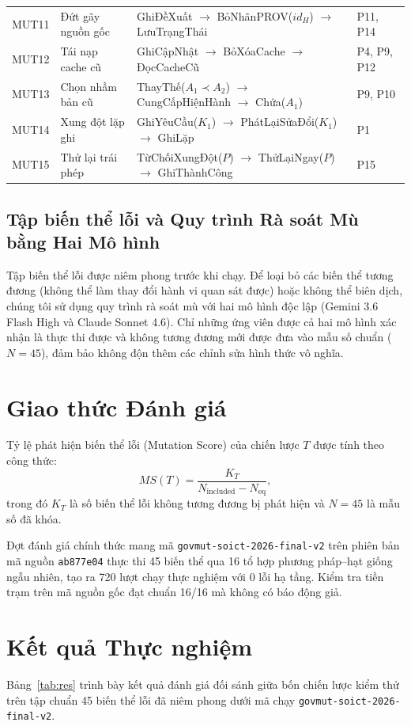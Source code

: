 \documentclass[11pt]{article}
\begin{document}
\begin{table}[t]
\begin{tabularx}{\textwidth}{p{}p{}p{}X}
MUT11 & Đứt gãy nguồn gốc & GhiĐềXuất $\to$ BỏNhãnPROV($id_H$) $\to$ LưuTrạngThái & P11, P14\\
MUT12 & Tái nạp cache cũ & GhiCậpNhật $\to$ BỏXóaCache $\to$ ĐọcCacheCũ & P4, P9, P12\\
MUT13 & Chọn nhầm bản cũ & ThayThế($A_1 \prec A_2$) $\to$ CungCấpHiệnHành $\to$ Chứa($A_1$) & P9, P10\\
MUT14 & Xung đột lặp ghi & GhiYêuCầu($K_1$) $\to$ PhátLạiSửaĐổi($K_1$) $\to$ GhiLặp & P1\\
MUT15 & Thử lại trái phép & TừChốiXungĐột($P$) $\to$ ThửLạiNgay($P$) $\to$ GhiThànhCông & P15\\
\bottomrule
\end{tabularx}
\end{table}

\subsection{Tập biến thể lỗi và Quy trình Rà soát Mù bằng Hai Mô hình}
Tập biến thể lỗi được niêm phong trước khi chạy. Để loại bỏ các biến thể tương đương (không thể làm thay đổi hành vi quan sát được) hoặc không thể biên dịch, chúng tôi sử dụng quy trình rà soát mù với hai mô hình độc lập (Gemini 3.6 Flash High và Claude Sonnet 4.6). Chỉ những ứng viên được cả hai mô hình xác nhận là thực thi được và không tương đương mới được đưa vào mẫu số chuẩn ($N = 45$), đảm bảo không độn thêm các chỉnh sửa hình thức vô nghĩa.

\section{Giao thức Đánh giá}
Tỷ lệ phát hiện biến thể lỗi (Mutation Score) của chiến lược $T$ được tính theo công thức:
\begin{equation}
MS(T) = \frac{K_T}{N_{\text{included}} - N_{\text{eq}}},
\end{equation}
trong đó $K_T$ là số biến thể lỗi không tương đương bị phát hiện và $N = 45$ là mẫu số đã khóa.

Đợt đánh giá chính thức mang mã \texttt{govmut-soict-2026-final-v2} trên phiên bản mã nguồn \texttt{ab877e04} thực thi 45 biến thể qua 16 tổ hợp phương pháp--hạt giống ngẫu nhiên, tạo ra 720 lượt chạy thực nghiệm với 0 lỗi hạ tầng. Kiểm tra tiền trạm trên mã nguồn gốc đạt chuẩn 16/16 mà không có báo động giả.

\section{Kết quả Thực nghiệm}
Bảng~\ref{tab:res} trình bày kết quả đánh giá đối sánh giữa bốn chiến lược kiểm thử trên tập chuẩn 45 biến thể lỗi đã niêm phong dưới mã chạy \texttt{govmut-soict-2026-final-v2}.
\end{document}
